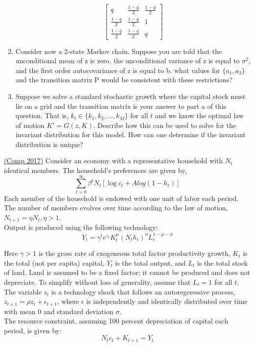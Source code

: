 \documentclass[answers]{exam}
\begin{document}
\begin{questions}
\begin{parts}
\begin{enumerate}
\begin{solution}
$$\begin{bmatrix}
                q & \frac{1-q}{2} & \frac{1-q}{2}\\
                \frac{1-q}{2} & \frac{1-q}{2} & 1\\
                \frac{1-q}{2} & \frac{1-q}{2} & q
            \end{bmatrix}$$
        \end{solution}
        \item Consider now a 2-state Markov chain. Suppose you are told that the unconditional mean of z is zero, the unconditional variance of z is equal to $\sigma^2$, and the first order autocovariance of z is equal to b. what values for $\{a_1,a_2\}$ and the transition matrix P would be consistent with these restrictions?
        \item Suppose we solve a standard stochastic growth where the capital stock must lie on a grid and the transition matrix is your answer to part a of this question. That is, $k_t \in \{k_1,k_2,...,k_M\}$ for all $t$ and we know the optimal law of motion $K' = G(z,K)$. Describe how this can be used to solve for the invariant distribution for this model. How can one determine if the invariant distribution is unique?
    \end{enumerate}
\end{parts}

\question \href{https://drive.google.com/drive/folders/11xTRC6EWE1VcPfk5BbXZRyGUX5oQ-jvo}{(Comp 2017)} Consider an economy with a representative household with $N_t$ identical members. The household's preferences are given by,
$$\sum_{t=0}^{\infty} \beta^t N_t [\log{c_t} + A log(1-h_t)]$$
Each member of the household is endowed with one unit of labor each period. The number of members evolves over time according to the law of motion, $N_{t+1} = \eta N_t, \eta>1$. \\
Output is produced using the following technology:
$$Y_t = \gamma^t e^{z_t} K_t^\mu (N_t h_t)^{\phi} L_t^{1-\mu - \phi}$$

Here $\gamma > 1$ is the gross rate of exogeneous total factor productivity growth, $K_t$ is the total (not per capita) capital, $Y_t$ is the total output, and $L_t$ is the total stock of land. Land is assumed to be a fixed factor; it cannot be produced and does not depreciate. To simplify without loss of generality, assume that $L_t = 1$ for all $t$. \\
The variable $z_t$ is a technology shock that follows an autoregeressive process, $z_{t+1} =\rho z_t + \epsilon_{t+1}$, where $\epsilon$ is independently and identically distributed over time with mean 0 and standard deviation $\sigma$.\\
The resource constraint, assuming 100 percent depreciation of capital each period, is given by:
$$N_t c_t + K_{t+1} = Y_t$$
\begin{parts}

\end{parts}
\end{questions}
\end{document}
